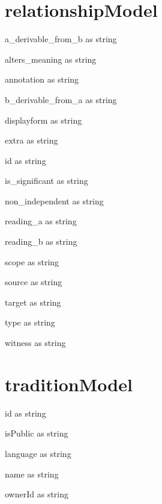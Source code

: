 \section{relationshipModel}
\begin{property}
a\_derivable\_from\_b as string
\end{property}
\begin{property}
alters\_meaning as string
\end{property}
\begin{property}
annotation as string
\end{property}
\begin{property}
b\_derivable\_from\_a as string
\end{property}
\begin{property}
displayform as string
\end{property}
\begin{property}
extra as string
\end{property}
\begin{property}
id as string
\end{property}
\begin{property}
is\_significant as string
\end{property}
\begin{property}
non\_independent as string
\end{property}
\begin{property}
reading\_a as string
\end{property}
\begin{property}
reading\_b as string
\end{property}
\begin{property}
scope as string
\end{property}
\begin{property}
source as string
\end{property}
\begin{property}
target as string
\end{property}
\begin{property}
type as string
\end{property}
\begin{property}
witness as string
\end{property}
\section{traditionModel}
\begin{property}
id as string
\end{property}
\begin{property}
isPublic as string
\end{property}
\begin{property}
language as string
\end{property}
\begin{property}
name as string
\end{property}
\begin{property}
ownerId as string
\end{property}
